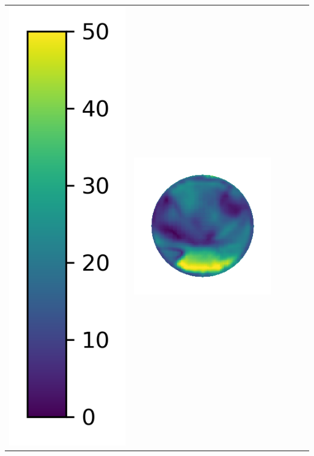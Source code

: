 \begin{tabularx}{\linewidth}{@{}Y@{}Y@{}Y@{}Y@{}Y@{}Y@{}}
\includegraphics[width=0.2\linewidth]{semisynthetic/colorbar_error_vertical.png} &
\includegraphics[width=\linewidth]{semisynthetic/20160617_13_ours_err.png} &

\end{tabularx}
